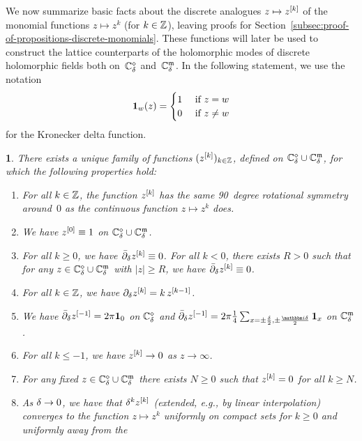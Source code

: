 \documentclass[12pt,oneside,english]{amsart}
\numberwithin{equation}{section}
\numberwithin{figure}{section}
\theoremstyle{plain}
\theoremstyle{plain}
\theoremstyle{plain}
\newtheorem{prop}[thm]{\protect\propositionname}
\theoremstyle{plain}
\theoremstyle{remark}
\theoremstyle{definition}
\theoremstyle{plain}
\theoremstyle{plain}
\numberwithin{thm}{section}
\newcommand{\kallemod}[1]{{\color{kallecol} {#1}}}
\providecommand{\propositionname}{Proposition}
\providecommand{\propositionname}{Proposition}
\providecommand{\propositionname}{Proposition}
\providecommand{\propositionname}{Proposition}
\begin{document}
We now summarize basic facts about the discrete analogues $z\mapsto {z^{[{k}]}}$
of the monomial functions $z\mapsto z^{k}$ (for $k\in\mathbb{Z} $),
leaving proofs for 
Section~\ref{subsec:proof-of-propositions-discrete-monomials}.
These functions will later be used to construct the lattice counterparts
of the holomorphic modes of discrete holomorphic fields both on~${\mathbb{C}_{{\delta}}^{\diamond}}$
and~${\mathbb{C}_{{\delta}}^{\mathfrak{m}}}$. In the following statement, we use the notation 
\[ \mathbf{1}_w(z) = \begin{cases}
                     1 & \text{ if } z = w \\
                     0 & \text{ if } z \neq w
                     \end{cases}
\]
for the Kronecker delta function.
\begin{prop}
\label{prop:integer-monomials}There exists a unique family of functions
$({z^{[{k}]}})_{k \in\mathbb{Z} }$, defined on 
${\mathbb{C}_{{\delta}}^{\diamond}}\cup{\mathbb{C}_{{\delta}}^{\mathfrak{m}}}$,
for which the following properties hold:
\begin{enumerate}
\item For all $k \in \mathbb{Z}$,
the function ${z^{[{k}]}}$ has the same
90~degree rotational symmetry around~$0$
as the continuous function $z \mapsto z^{k}$
does. 
\item We have ${z^{[{0}]}} \equiv 1$ on 
${\mathbb{C}_{{\delta}}^{\diamond}}\cup{\mathbb{C}_{{\delta}}^{\mathfrak{m}}}$. 
\item For all $k\geq0$,
we have ${{\bar{\partial}}}_{{\delta}} {z^{[{k}]}} \equiv 0$. For all $k<0$, there 
exists $R>0$ such that for any 
$z\in{\mathbb{C}_{{\delta}}^{\diamond}}\cup{\mathbb{C}_{{\delta}}^{\mathfrak{m}}}$
with $\left|z\right|\geq R$, we have ${{\bar{\partial}}}_{{\delta}} {z^{[{k}]}} \equiv 0$. 
\item For all $k \in \mathbb{Z}$, we have ${\partial}_{{\delta}} 
{z^{[{k}]}} = k \, {z^{[{k-1}]}}$. 
\item We have ${{\bar{\partial}}}_{{\delta}} {z^{[{-1}]}} = 2\pi \mathbf{1}_{0}$
on ${\mathbb{C}_{{\delta}}^{\diamond}}$ and 
$\ddeebar \dmon{z}{-1}  =
    2\pi \frac{1}{4}
    \sum_{x=\pm\frac{\meshsz }{2},\pm\frac{\ii \meshsz }{2}}
    \indicator_{x}$
on ${\mathbb{C}_{{\delta}}^{\mathfrak{m}}}$. 
\item For all $k\leq-1$, we have ${z^{[{k}]}}  \to 0$ as $z \to \infty$. 
\item For any fixed $z\in{\mathbb{C}_{{\delta}}^{\diamond}}\cup{\mathbb{C}_{{\delta}}^{\mathfrak{m}}}$
there exists $N\geq0$ such that ${z^{[{k}]}} =0$ for all $k\geq N$. 
\item As ${\delta}  \to 0$, we have that
${\delta}^{k} {z^{[{k}]}} $ (extended,
e.g., by linear interpolation) converges to
the function $z \mapsto z^{k}$
uniformly on compact sets for $k\geq0$ and uniformly away from the

\end{enumerate}
\end{prop}
\end{document}
